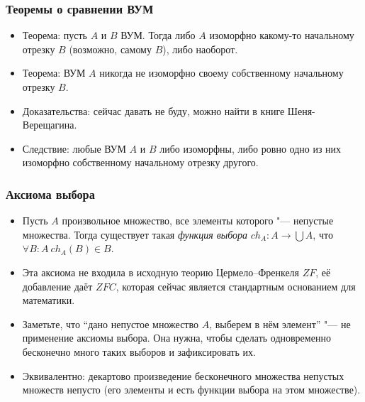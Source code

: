 \documentclass[10pt]{beamer}
\begin{document}
\begin{frame}
    \frametitle{Теоремы о сравнении ВУМ}
    \begin{itemize}
        \item Теорема: пусть $A$ и $B$ ВУМ. Тогда либо $A$ изоморфно какому-то начальному отрезку $B$ (возможно, самому $B$), либо наоборот.
        \item Теорема: ВУМ $A$ никогда не изоморфно своему собственному начальному отрезку $B$.
        \item Доказательства: сейчас давать не буду, можно найти в книге Шеня-Верещагина.
        \item Следствие: любые ВУМ $A$ и $B$ либо изоморфны, либо ровно одно из них изоморфно собственному начальному отрезку другого.
    \end{itemize}
\end{frame}

\begin{frame}
    \frametitle{Аксиома выбора}
    \begin{itemize}
        \item Пусть $A$ произвольное множество, все элементы которого "--- непустые множества. Тогда существует такая \emph{функция выбора} $ch_A: A  \to \bigcup A$, что $\forall B: A ~ ch_A(B) \in B$.
        \item Эта аксиома не входила в исходную теорию Цермело--Френкеля $ZF$, её добавление даёт $ZFC$, которая сейчас является стандартным основанием для математики.
        \item Заметьте, что \enquote{дано непустое множество $A$, выберем в нём элемент} "--- не применение аксиомы выбора. Она нужна, чтобы сделать одновременно бесконечно много таких выборов и зафиксировать их.
        \item Эквивалентно: декартово произведение бесконечного множества непустых множеств непусто (его элементы и есть функции выбора на этом множестве).
    \end{itemize}
\end{frame}
\end{document}

